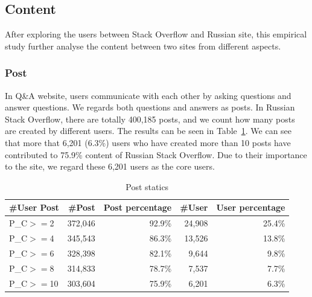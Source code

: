 \subsection{Content}
After exploring the users between Stack Overflow and Russian site, this empirical study further analyse the content between two sites from different aspects.

\subsubsection{Post}
In Q\&A website, users communicate with each other by asking questions and answer questions.
We regards both questions and answers as posts.
In Russian Stack Overflow, there are totally 400,185 posts, and we count how many posts are created by different users.
The results can be seen in Table~\ref{tab:postnumber}.
We can see that more that 6,201 (6.3\%) users who have created more than 10 posts have contributed to 75.9\% content of Russian Stack Overflow.
Due to their importance to the site, we regard these 6,201 users as the core users.

\begin{table}
	\centering
	\caption{Post statics}
	\label{tab:postnumber}
	\begin{tabular}{lrrrr}
		\hline
		\#User Post & \#Post & Post percentage& \#User &User percentage \\
		\hline
		P\_C$>=$2 &372,046&92.9\%&24,908&25.4\%\\
		P\_C$>=$4 &345,543&86.3\%&13,526&13.8\%\\
		P\_C$>=$6 &328,398&82.1\%&9,644&9.8\%\\
		P\_C$>=$8 &314,833&78.7\%&7,537&7.7\%\\
		P\_C$>=$10&303,604&75.9\%&6,201&6.3\%\\
		\hline
	\end{tabular}
\end{table}	

